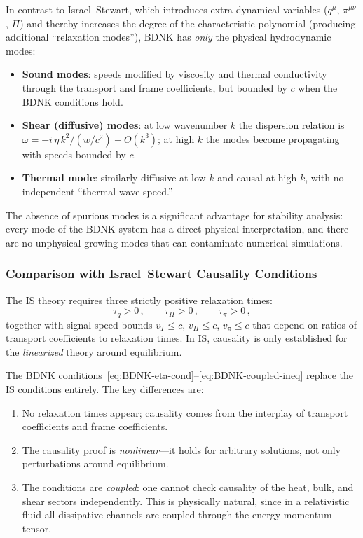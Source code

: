 In contrast to Israel--Stewart, which introduces extra dynamical
variables ($q^{\mu}$, $\pi^{\mu\nu}$, $\Pi$) and thereby increases
the degree of the characteristic polynomial (producing additional
``relaxation modes''), BDNK has \emph{only} the physical
hydrodynamic modes:
\begin{itemize}
  \item \textbf{Sound modes}: speeds modified by viscosity and thermal
    conductivity through the transport and frame coefficients, but
    bounded by $c$ when the BDNK conditions hold.
  \item \textbf{Shear (diffusive) modes}: at low wavenumber $k$ the
    dispersion relation is $\omega = -i\,\eta\,k^{2}/(w/c^{2}) + O(k^{3})$;
    at high $k$ the modes become propagating with speeds bounded by $c$.
  \item \textbf{Thermal mode}: similarly diffusive at low $k$ and causal
    at high $k$, with no independent ``thermal wave speed.''
\end{itemize}
The absence of spurious modes is a significant advantage for stability
analysis: every mode of the BDNK system has a direct physical
interpretation, and there are no unphysical growing modes that can
contaminate numerical simulations.

\subsubsection{Comparison with Israel--Stewart Causality Conditions}
The IS theory requires three strictly positive relaxation times:
\begin{equation}
  \tau_{q} > 0\,,\qquad
  \tau_{\Pi} > 0\,,\qquad
  \tau_{\pi} > 0\,,
  \tag{IS causality}
  \label{eq:IS-causality-old}
\end{equation}
together with signal-speed bounds $v_{T} \le c$, $v_{\Pi} \le c$,
$v_{\pi} \le c$ that depend on ratios of transport coefficients to
relaxation times.  In IS, causality is only established for the
\emph{linearized} theory around equilibrium.

The BDNK conditions~\eqref{eq:BDNK-eta-cond}--\eqref{eq:BDNK-coupled-ineq}
replace the IS conditions entirely.  The key differences are:
\begin{enumerate}
  \item No relaxation times appear; causality comes from the
    interplay of transport coefficients and frame coefficients.
  \item The causality proof is \emph{nonlinear}---it holds for
    arbitrary solutions, not only perturbations around equilibrium.
  \item The conditions are \emph{coupled}: one cannot check causality
    of the heat, bulk, and shear sectors independently.  This is
    physically natural, since in a relativistic fluid all dissipative
    channels are coupled through the energy-momentum tensor.
\end{enumerate}

